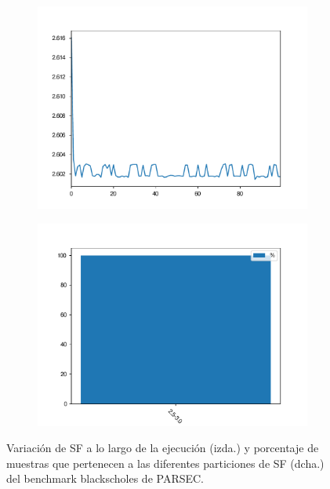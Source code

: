 \begin{figure}
\centering
\begin{subfigure}{.5\textwidth}
  \centering
  \includegraphics[width=.99\linewidth]{sf_over_time_blackscholes-omp_p.pdf}
\end{subfigure}%
\begin{subfigure}{.5\textwidth}
  \centering
  \includegraphics[width=.99\linewidth]{sf_partitions_blackscholes-omp_p.pdf}
\end{subfigure}
\caption{Variación de SF a lo largo de la ejecución (izda.) y porcentaje de muestras que pertenecen a las diferentes particiones de SF (dcha.) del benchmark blackscholes de PARSEC.}
\label{fig:b3}
\end{figure}



